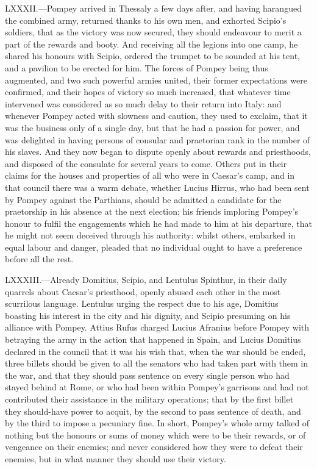 LXXXII.—Pompey arrived in Thessaly a few days after, and having
harangued the combined army, returned thanks to his own men, and
exhorted Scipio's soldiers, that as the victory was now secured, they
should endeavour to merit a part of the rewards and booty. And receiving
all the legions into one camp, he shared his honours with Scipio,
ordered the trumpet to be sounded at his tent, and a pavilion to be
erected for him. The forces of Pompey being thus augmented, and two such
powerful armies united, their former expectations were confirmed, and
their hopes of victory so much increased, that whatever time intervened
was considered as so much delay to their return into Italy: and whenever
Pompey acted with slowness and caution, they used to exclaim, that it
was the business only of a single day, but that he had a passion for
power, and was delighted in having persons of consular and praetorian
rank in the number of his slaves. And they now began to dispute openly
about rewards and priesthoods, and disposed of the consulate for several
years to come. Others put in their claims for the houses and properties
of all who were in Caesar's camp, and in that council there was a warm
debate, whether Lucius Hirrus, who had been sent by Pompey against the
Parthians, should be admitted a candidate for the praetorship in his
absence at the next election; his friends imploring Pompey's honour to
fulfil the engagements which he had made to him at his departure, that
he might not seem deceived through his authority: whilst others,
embarked in equal labour and danger, pleaded that no individual ought to
have a preference before all the rest.

LXXXIII.—Already Domitius, Scipio, and Lentulus Spinthur, in their
daily quarrels about Caesar's priesthood, openly abused each other in
the most scurrilous language. Lentulus urging the respect due to his
age, Domitius boasting his interest in the city and his dignity, and
Scipio presuming on his alliance with Pompey. Attius Rufus charged
Lucius Afranius before Pompey with betraying the army in the action that
happened in Spain, and Lucius Domitius declared in the council that it
was his wish that, when the war should be ended, three billets should be
given to all the senators who had taken part with them in the war, and
that they should pass sentence on every single person who had stayed
behind at Rome, or who had been within Pompey's garrisons and had not
contributed their assistance in the military operations; that by the
first billet they should-have power to acquit, by the second to pass
sentence of death, and by the third to impose a pecuniary fine. In
short, Pompey's whole army talked of nothing but the honours or sums of
money which were to be their rewards, or of vengeance on their enemies;
and never considered how they were to defeat their enemies, but in what
manner they should use their victory.

